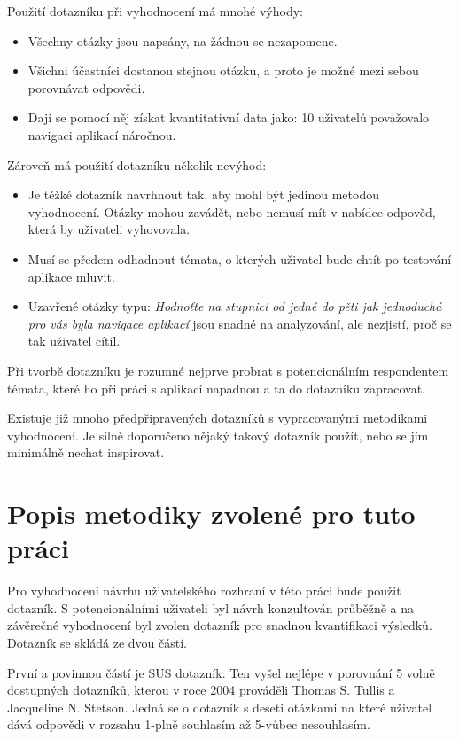 Použití dotazníku při vyhodnocení má mnohé výhody\cite{stone2005user}:
\begin{itemize}
\item Všechny otázky jsou napsány, na žádnou se nezapomene.
\item Všichni účastníci dostanou stejnou otázku, a proto je možné mezi sebou porovnávat odpovědi.
\item Dají se pomocí něj získat kvantitativní data jako: 10 uživatelů považovalo navigaci aplikací náročnou.
\end{itemize}
Zároveň má použití dotazníku několik nevýhod\cite{stone2005user}:
\begin{itemize}
\item Je těžké dotazník navrhnout tak, aby mohl být jedinou metodou vyhodnocení. Otázky mohou zavádět, nebo nemusí mít v nabídce odpověď, která by uživateli vyhovovala.
\item Musí se předem odhadnout témata, o kterých uživatel bude chtít po testování aplikace mluvit.
\item Uzavřené otázky typu: \emph{Hodnoťte na stupnici od jedné do pěti jak jednoduchá pro vás byla navigace aplikací} jsou snadné na analyzování, ale nezjistí, proč se tak uživatel cítil.
\end{itemize}

Při tvorbě dotazníku je rozumné nejprve probrat s potencionálním respondentem témata, které ho při práci s aplikací napadnou a ta do dotazníku zapracovat\cite{stone2005user}.

Existuje již mnoho předpřipravených dotazníků s vypracovanými metodikami vyhodnocení. Je silně doporučeno nějaký takový dotazník použít, nebo se jím minimálně nechat inspirovat\cite{stone2005user}.

\section{Popis metodiky zvolené pro tuto práci}
\label{sec:metodika-dotaznik}
Pro vyhodnocení návrhu uživatelského rozhraní v této práci bude použit dotazník. S potencionálními uživateli byl návrh konzultován průběžně a na závěrečné vyhodnocení byl zvolen dotazník pro snadnou kvantifikaci výsledků. Dotazník se skládá ze dvou částí.

První a povinnou částí je SUS dotazník. Ten vyšel nejlépe v porovnání 5 volně dostupných dotazníků, kterou v roce 2004 prováděli Thomas S. Tullis a Jacqueline N. Stetson\cite{tullis2004comparison}. Jedná se o dotazník s deseti otázkami na které uživatel dává odpovědi v rozsahu 1-plně souhlasím až 5-vůbec nesouhlasím.

